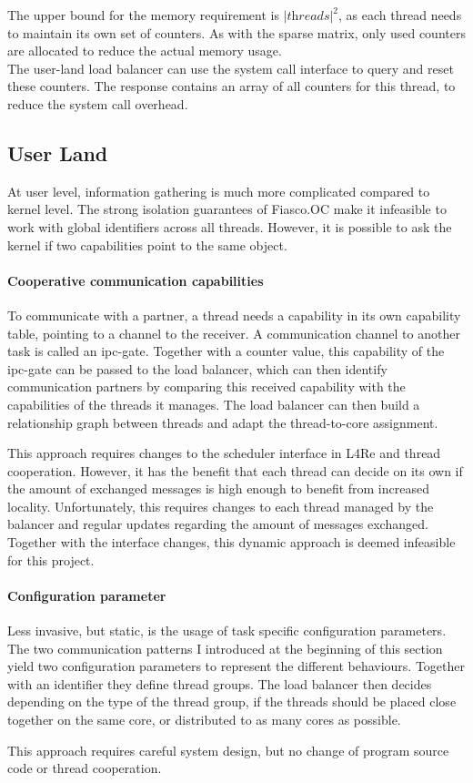 The upper bound for the memory requirement is $|\textit{threads}|^2$, as each thread
needs to maintain its own set of counters.
As with the sparse matrix, only used counters are allocated to reduce the
actual memory usage.
\\

The user-land load balancer can use the system call interface to query
and reset these counters.
The response contains an array of all counters for this thread, to reduce the
system call overhead.


\subsection{User Land}
At user level, information gathering is much more complicated compared to
kernel level.
The strong isolation guarantees of Fiasco.OC make it infeasible to work with global
identifiers across all threads.
However, it is possible to ask the kernel if two capabilities point to the
same object.

\paragraph{Cooperative communication capabilities}
To communicate with a partner, a thread needs a capability in its own
capability table, pointing to a channel to the receiver.
A communication channel to another task is called an \gls{ipc}-gate.
Together with a counter value, this capability of the \gls{ipc}-gate can be
passed to the load balancer, which can then identify communication partners by
comparing this received capability with the capabilities of the threads
it manages.
The load balancer can then build a relationship graph between threads and adapt
the thread-to-core assignment.

This approach requires changes to the scheduler interface in L4Re and
thread cooperation.
However, it has the benefit that each thread can decide on its own if the
amount of exchanged messages is high enough to benefit from increased
locality.
Unfortunately, this requires changes to each thread managed by the balancer and
regular updates regarding the amount of messages exchanged.
Together with the interface changes, this dynamic approach is deemed infeasible
for this project.

\paragraph{Configuration parameter}
Less invasive, but static, is the usage of task specific configuration parameters.
The two communication patterns I introduced at the beginning of this section
yield two configuration parameters to represent the different behaviours.
Together with an identifier they define thread groups.
The load balancer then decides depending on the type of the thread group, if
the threads should be placed close together on the same core, or distributed to
as many cores as possible.

This approach requires careful system design, but no change of program source
code or thread cooperation.
